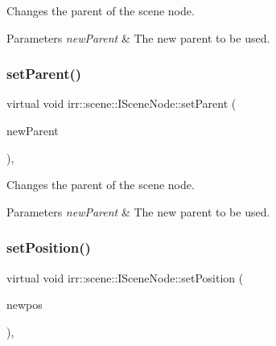 Changes the parent of the scene node. 


\begin{DoxyParams}{Parameters}
{\em new\+Parent} & The new parent to be used. \\
\hline
\end{DoxyParams}
\mbox{\label{classirr_1_1scene_1_1ISceneNode_a59e7f36cb5c9c4895e06fce0ca5eb276}} 
\subsubsection{\texorpdfstring{set\+Parent()}{setParent()}\hspace{0.1cm}{\footnotesize\ttfamily [2/2]}}
{\footnotesize\ttfamily virtual void irr\+::scene\+::\+I\+Scene\+Node\+::set\+Parent (\begin{DoxyParamCaption}\item[{\hyperlink{classirr_1_1scene_1_1ISceneNode}{I\+Scene\+Node} $\ast$}]{new\+Parent }\end{DoxyParamCaption})\hspace{0.3cm}{\ttfamily [inline]}, {\ttfamily [virtual]}}



Changes the parent of the scene node. 


\begin{DoxyParams}{Parameters}
{\em new\+Parent} & The new parent to be used. \\
\hline
\end{DoxyParams}
\mbox{\label{classirr_1_1scene_1_1ISceneNode_a2166eb0a92cc0e46c49266f41a68ed50}} 
\subsubsection{\texorpdfstring{set\+Position()}{setPosition()}\hspace{0.1cm}{\footnotesize\ttfamily [1/2]}}
{\footnotesize\ttfamily virtual void irr\+::scene\+::\+I\+Scene\+Node\+::set\+Position (\begin{DoxyParamCaption}\item[{const \hyperlink{namespaceirr_1_1core_ae6e2b2a6c552833ebbd5b7463d03586b}{core\+::vector3df} \&}]{newpos }\end{DoxyParamCaption})\hspace{0.3cm}{\ttfamily [inline]}, {\ttfamily [virtual]}}



